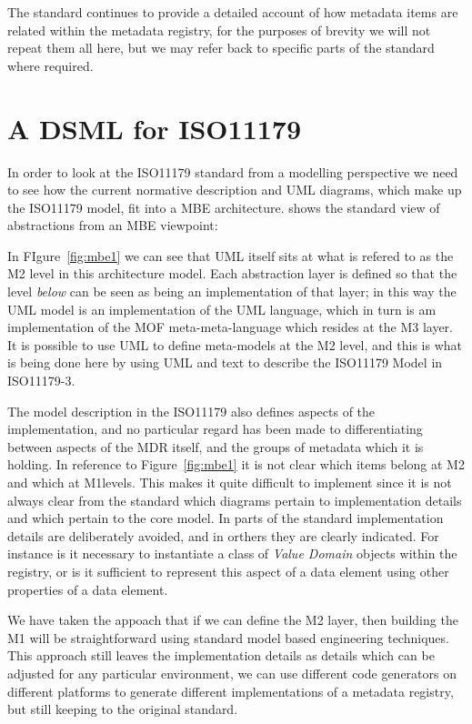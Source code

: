 \documentclass{llncs}
\begin{document}
The standard continues to provide a detailed account of how metadata items are related within the metadata registry, for the purposes of brevity we will not repeat them all here, but we may refer back to specific parts of the standard where required.



\section{A DSML for ISO11179}

In order to look at the ISO11179 standard from a modelling perspective we need to see how the current normative description and UML diagrams, which make up the ISO11179 model, fit into a MBE architecture.  shows the standard view of abstractions from an MBE viewpoint:




In FIgure~\ref{fig:mbe1}  we can see that UML itself sits at what is refered to as the M2 level in this architecture model. Each abstraction layer is defined so that the level \emph{below} can be seen as being an implementation of that layer; in this way the UML model is an implementation of the UML language, which in turn is am implementation of the MOF meta-meta-language which resides at the M3 layer. It is possible to use UML to define meta-models at the M2 level, and this is what is being done here by using UML and text to describe the ISO11179 Model in ISO11179-3. 

The model description in the ISO11179 also defines aspects of the implementation, and no particular regard has been made to differentiating between aspects of the MDR itself, and the groups of metadata which it is holding. In reference to Figure~\ref{fig:mbe1} it is not clear which items belong at M2 and which at M1levels. This makes it quite difficult to implement since it is not always clear from the standard which diagrams pertain to implementation details and which pertain to the core model. In parts of the standard implementation details are deliberately avoided, and in orthers they are clearly indicated. For instance is it necessary to instantiate a class of \emph{Value Domain} objects within the registry, or is it sufficient to represent this aspect of a data element using other properties of a data element.

We have taken the appoach that if we can define the M2 layer, then building the M1 will be straightforward using standard model based engineering techniques. This approach still leaves the implementation details as details which can be adjusted for any particular environment, we can use different code generators on different platforms to generate different implementations of a metadata registry, but still keeping to the original standard.
\end{document}
